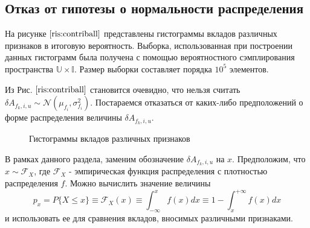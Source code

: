 \documentclass[12pt,a4paper]{report}
\begin{document}
\subsection{Отказ от гипотезы о нормальности распределения}
На рисунке $\ref{ris:contriball}$ представлены гистограммы вкладов различных признаков в итоговую вероятность. Выборка, использованная при построении данных гистограмм была получена с помощью вероятностного сэмплирования пространства $\mathbb{U} \times \mathbb{I}$. Размер выборки составляет порядка $10^5$ элементов.

Из Рис. $\ref{ris:contriball}$ становится очевидно, что нельзя считать $\delta A_{f_k, i, u} \sim \mathcal{N}(\mu_{f_i}, \sigma_{f_i}^2)$. Постараемся отказаться от каких-либо предположений о форме распределения величины $\delta A_{f_k, i, u}$.

\begin{figure}[pH]
\begin{minipage}[h]{0.49\linewidth}
\end{minipage}
\hfill
\begin{minipage}[h]{0.49\linewidth}
\end{minipage}
\begin{minipage}[h]{1.\linewidth}
\end{minipage}
\caption{Гистограммы вкладов различных признаков}
\label{ris:contriball}
\end{figure}

В рамках данного раздела, заменим обозначение $\delta A_{f_k, i, u}$ на $x$.
Предположим, что $x \sim \mathcal{F}_{X}$, где $\mathcal{F}_{X}$ - эмпирическая функция распределения с плотностью распределения $f$. Можно вычислить значение величины 
\begin{equation*}
p_{x} = \textit{P}\{X \le x\} \equiv \mathcal{F}_X(x) \equiv \int_{-\infty}^{x}f(x)dx \equiv 1 - \int_{x}^{+\infty}f(x)dx
\end{equation*}
и использовать ее для сравнения вкладов, вносимых различными признаками.
\end{document}
